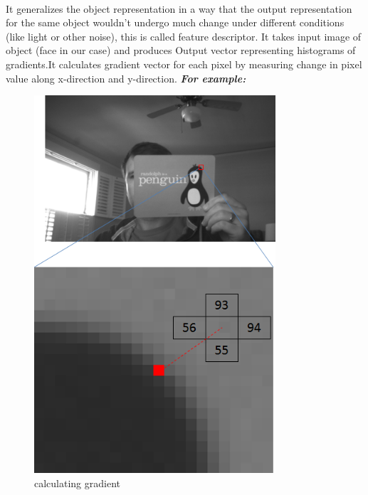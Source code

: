 \paragraph{}It generalizes the object representation in a way that the output representation for the same object wouldn’t undergo much change under different conditions (like light or other noise), this is called feature descriptor.
It takes input image of object (face in our case) and produces Output vector representing histograms of gradients.\newline It calculates gradient vector for each pixel by measuring change in pixel value along x-direction and y-direction. \newline \newline \textbf{\textit{For example:}} \newline
\begin{figure}
    \centering
	\includegraphics[width=0.80\textwidth]{hog_pixel_ex.png}
	\caption{calculating gradient}
	\label{fig:calculating gradient}
\end{figure}
\newline
